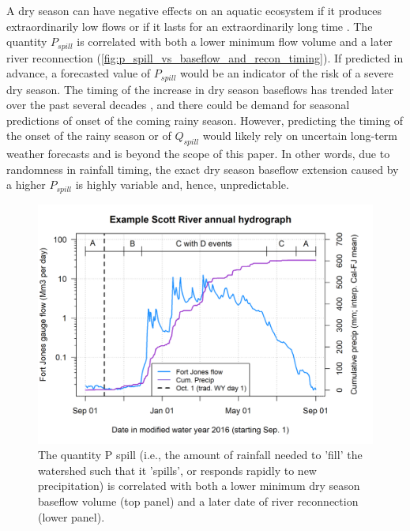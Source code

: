 \documentclass[hess, manuscript]{copernicus}
\begin{document}
A dry season can have negative effects on an aquatic ecosystem if it
produces extraordinarily low flows or if it lasts for an extraordinarily
long time \citeyearpar[e.g., delayed salmon habitat access documented in
CDFW][]{CDFW2015a}. The quantity \(P_{spill}\) is correlated with both a
lower minimum flow volume and a later river reconnection
(\autoref{fig:p_spill_vs_baseflow_and_recon_timing}). If predicted in
advance, a forecasted value of \(P_{spill}\) would be an indicator of
the risk of a severe dry season. The timing of the increase in dry
season baseflows has trended later over the past several decades
\citeyearpar[see Siskiyou County][]{SiskiyouCounty2021}, and there could
be demand for seasonal predictions of onset of the coming rainy season.
However, predicting the timing of the onset of the rainy season or of
\(Q_{spill}\) would likely rely on uncertain long-term weather forecasts
and is beyond the scope of this paper. In other words, due to randomness
in rainfall timing, the exact dry season baseflow extension caused by a
higher \(P_{spill}\) is highly variable and, hence, unpredictable.

\begin{figure}
\includegraphics[width=1\linewidth]{f02} \caption{\label{fig:p_spill_vs_baseflow_and_recon_timing} The quantity P spill (i.e., the amount of rainfall needed to 'fill' the watershed such that it 'spills', or responds rapidly to new precipitation) is correlated with both a lower minimum dry season baseflow volume (top panel) and a later date of river reconnection (lower panel).}\label{fig:p_spill_vs_baseflow_and_recon_timing}
\end{figure}
\end{document}
